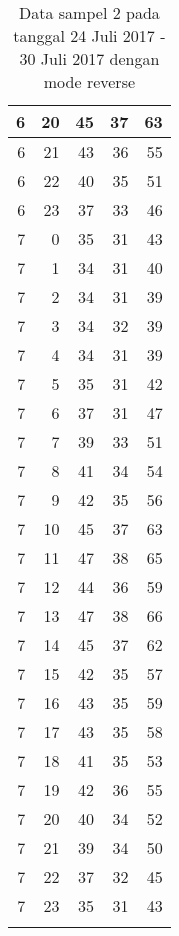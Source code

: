 \begin{longtable}{|r|r|r|r|r|}
    \hline
    6     & 20    & 45    & 37    & 63 \\
    \hline
    6     & 21    & 43    & 36    & 55 \\
    \hline
    6     & 22    & 40    & 35    & 51 \\
    \hline
    6     & 23    & 37    & 33    & 46 \\
    \hline
    7     & 0     & 35    & 31    & 43 \\
    \hline
    7     & 1     & 34    & 31    & 40 \\
    \hline
    7     & 2     & 34    & 31    & 39 \\
    \hline
    7     & 3     & 34    & 32    & 39 \\
    \hline
    7     & 4     & 34    & 31    & 39 \\
    \hline
    7     & 5     & 35    & 31    & 42 \\
    \hline
    7     & 6     & 37    & 31    & 47 \\
    \hline
    7     & 7     & 39    & 33    & 51 \\
    \hline
    7     & 8     & 41    & 34    & 54 \\
    \hline
    7     & 9     & 42    & 35    & 56 \\
    \hline
    7     & 10    & 45    & 37    & 63 \\
    \hline
    7     & 11    & 47    & 38    & 65 \\
    \hline
    7     & 12    & 44    & 36    & 59 \\
    \hline
    7     & 13    & 47    & 38    & 66 \\
    \hline
    7     & 14    & 45    & 37    & 62 \\
    \hline
    7     & 15    & 42    & 35    & 57 \\
    \hline
    7     & 16    & 43    & 35    & 59 \\
    \hline
    7     & 17    & 43    & 35    & 58 \\
    \hline
    7     & 18    & 41    & 35    & 53 \\
    \hline
    7     & 19    & 42    & 36    & 55 \\
    \hline
    7     & 20    & 40    & 34    & 52 \\
    \hline
    7     & 21    & 39    & 34    & 50 \\
    \hline
    7     & 22    & 37    & 32    & 45 \\
    \hline
    7     & 23    & 35    & 31    & 43 \\
    \hline
    
  \caption{Data sampel 2 pada tanggal 24 Juli 2017 - 30 Juli 2017 dengan mode reverse}
  \label{tab:datasample224072017reverse}%
\end{longtable}%